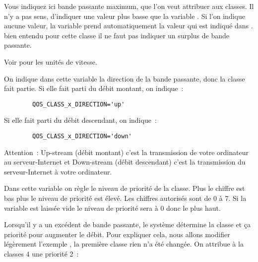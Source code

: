 \begin{description}

    Vous indiquez ici bande passante maximum, que l'on veut attribuer aux
    classes. Il n'y a pas sens, d'indiquer une valeur plus basse que la
    variable . Si l'on indique aucune
    valeur, la variable prend automatiquement la valeur qui est indiqué dans
    . bien entendu pour cette classe
    il ne faut pas indiquer un surplus de bande passante.

    Voir  pour les unités de vitesse.


    On indique dans cette variable la direction de la bande passante, donc
    la classe fait partie. Si elle fait parti du débit montant, on indique~:

\begin{example}
\begin{verbatim}
        QOS_CLASS_x_DIRECTION='up'
\end{verbatim}
\end{example}

    Si elle fait parti du débit descendant, on indique~:

\begin{example}
\begin{verbatim}
        QOS_CLASS_x_DIRECTION='down'
\end{verbatim}
\end{example}

    Attention~: Up-stream (débit montant) c'est la transmission de votre ordinateur
    au serveur-Internet et Down-stream (débit descendant) c'est la transmission du
    serveur-Internet à votre ordinateur.


    Dans cette variable on règle le niveau de priorité de la classe.
    Plus le chiffre est bas plus le niveau de priorité est élevé. Les
    chiffres autorisés sont de 0 à 7. Si la variable est laissée vide
    le niveau de priorité sera à 0 donc le plus haut.

    Lorsqu'il y a un excédent de bande passante, le système détermine
    la classe et ça priorité pour augmenter le débit. Pour expliquer cela, nous
    allons modifier légèrement l'exemple ,
    la première classe rien n'a été changée. On attribue à la classes 4 une priorité 2~:


\end{description}
